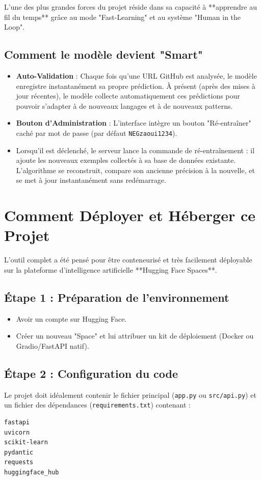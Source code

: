 \documentclass[a4paper,11pt]{article}
\begin{document}
L'une des plus grandes forces du projet réside dans sa capacité à **apprendre au fil du temps** grâce au mode "Fast-Learning" et au système "Human in the Loop".

\subsection{Comment le modèle devient "Smart"}
\begin{itemize}
    \item \textbf{Auto-Validation} : Chaque fois qu'une URL GitHub est analysée, le modèle enregistre instantanément sa propre prédiction. À présent (après des mises à jour récentes), le modèle collecte automatiquement ces prédictions pour pouvoir s'adapter à de nouveaux langages et à de nouveaux patterns.
    \item \textbf{Bouton d'Administration} : L'interface intègre un bouton "Ré-entraîner" caché par mot de passe (par défaut \texttt{NEGzaoui1234}). 
    \item Lorsqu'il est déclenché, le serveur lance la commande de ré-entraînement : il ajoute les nouveaux exemples collectés à sa base de données existante. L'algorithme se reconstruit, compare son ancienne précision à la nouvelle, et se met à jour instantanément sans redémarrage.
\end{itemize}


\section{Comment Déployer et Héberger ce Projet}

L'outil complet a été pensé pour être conteneurisé et très facilement déployable sur la plateforme d'intelligence artificielle **Hugging Face Spaces**.

\subsection{Étape 1 : Préparation de l'environnement}
\begin{itemize}
    \item Avoir un compte sur Hugging Face.
    \item Créer un nouveau "Space" et lui attribuer un kit de déploiement (Docker ou Gradio/FastAPI natif).
\end{itemize}

\subsection{Étape 2 : Configuration du code}
Le projet doit idéalement contenir le fichier principal (\texttt{app.py} ou \texttt{src/api.py}) et un fichier des dépendances (\texttt{requirements.txt}) contenant :
\begin{lstlisting}[language=bash]
fastapi
uvicorn
scikit-learn
pydantic
requests
huggingface_hub
\end{lstlisting}
\end{document}
